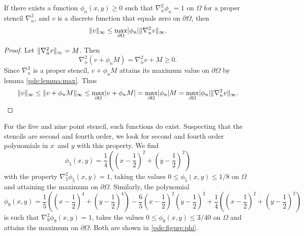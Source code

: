 \begin{lemma}\label{pde:lemma:bound}
  If there exists a function $\phi_n(x,y) \geq 0$ such that $\nabla_n^2 \phi_n = 1$ on $\Omega$ for a proper stencil $\nabla_n^2$, and $v$ is a discrete function that equals zero on $\partial \Omega$, then
  \begin{equation}
    \lVert v \rVert_\infty \leq \max_{\partial\Omega} \lvert \phi_n \rvert
    \lVert \nabla_n^2 v \rVert_\infty.
  \end{equation}
\end{lemma}
\begin{proof}

Let $\lVert \nabla_n^2 v \rVert_\infty = M$.
Then
$$
\nabla_n^2 (v + \phi_n M) = \nabla_n^2 v +  M \geq 0.
$$
Since $\nabla_n^2$ is a proper stencil, $v + \phi_n M$ attains its maximum value on $\partial \Omega$ by lemma \ref{pde:lemma:max}.
Thus
$$
\lVert v \rVert_\infty
\leq \lVert v + \phi_n M \rVert_\infty
\leq \max_{\partial \Omega} \lvert v + \phi_n M\rvert
= \max_{\partial\Omega} \lvert \phi_n \rvert M
= \max_{\partial\Omega} \lvert \phi_n \rvert \lVert \nabla_n^2 v \rVert_\infty. \qedhere
$$
\end{proof}

\begin{remark}
  For the five and nine point stencil, such functions do exist.
  Suspecting that the stencils are second and fourth order, we look for second and fourth order polynomials in $x$ and $y$ with this property.
  We find 
  \begin{equation}
    \phi_5(x,y) = \frac14 \left(\left(x-\frac12\right)^2 + \left(y-\frac12\right)^2\right)
    \label{pde:equation:phi5}
  \end{equation}
  with the property $\nabla_5^2 \phi_5(x,y) = 1$, taking the values $0 \leq \phi_5(x,y) \leq 1/8$ on $\Omega$ and attaining the maximum on $\partial \Omega$.
  \newcommand{\phinine}{\frac{1}{5} \left(\left(x-\frac{1}{2}\right)^4+\left(y-\frac{1}{2}\right)^4\right) - \frac{6}{5} \left(x-\frac{1}{2}\right)^2\left(y-\frac{1}{2}\right)^2 + \frac{1}{4} \left(\left(x-\frac{1}{2}\right)^2+\left(y-\frac{1}{2}\right)^2\right)}
  Similarly, the polynomial
  \begin{equation}
  \phi_9(x,y) = \phinine
  \label{pde:equation:phi9}
  \end{equation}
  is such that $\nabla_9^2 \phi_9(x,y) = 1$, takes the values $0 \leq \phi_9(x,y) \leq 3/40$ on $\Omega$ and attains the maximum on $\partial \Omega$.
  Both are shown in \cref{pde:figure:phi}.
\end{remark}

\newcommand{\phidisplay}[3]{
\begin{tikzpicture}
\begin{axis}[
	width=8.2cm, height=7.5cm,
	zmin=0.0,zmax=0.13,
	xlabel=$x$, xtick distance=0.25,
	ylabel=$y$, ytick distance=0.25,
	ztick={0,#2, 1/8}, zticklabels={0,#2, 1/8},
	scaled ticks=false,
	grid,
	title={$#3$},
  point meta max=0.13,  %
]
	\addplot3 [
		surf,
		domain=0:1,
	] {#1};
\end{axis}
\end{tikzpicture}
}

